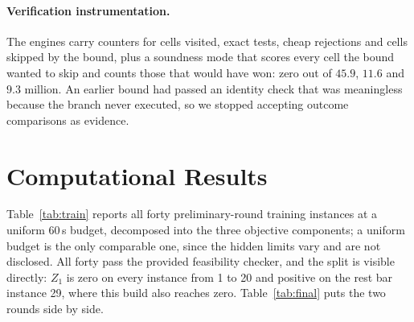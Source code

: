 \documentclass[runningheads]{llncs}
\begin{document}
\paragraph{Verification instrumentation.}
The engines carry counters for cells visited, exact tests, cheap rejections and cells skipped by
the bound, plus a soundness mode that scores every cell the bound wanted to skip and counts those
that would have won: zero out of $45.9$, $11.6$ and $9.3$ million. An earlier bound had passed an
identity check that was meaningless because the branch never executed, so we stopped accepting
outcome comparisons as evidence.

\section{Computational Results}

Table~\ref{tab:train} reports all forty preliminary-round training instances at a uniform $60$\,s
budget, decomposed into the three objective components; a uniform budget is the only comparable
one, since the hidden limits vary and are not disclosed. All forty pass the provided feasibility
checker, and the split is visible directly: $Z_1$ is zero on every instance from 1 to 20 and
positive on the rest bar instance 29, where this build also reaches zero.
Table~\ref{tab:final} puts the two rounds side by side.

\begin{table}[t]
\centering
\caption{Preliminary-round training set, all forty instances at $60$\,s. Sizes and bay counts are
in Table~\ref{tab:final}.}
\label{tab:train}
\footnotesize
\setlength{\tabcolsep}{1pt}
\end{table}

\begin{table}[t]
\centering
\caption{The two training sets compared, both at $60$\,s on the same build. They are different
instances: $w_1$ spans $333$ to $13{,}559$ on the final set against $667$ to $29{,}630$ on the
preliminary one, and $w_3$ reaches $800$ against $600$.}
\label{tab:final}
\footnotesize
\end{table}
\end{document}

